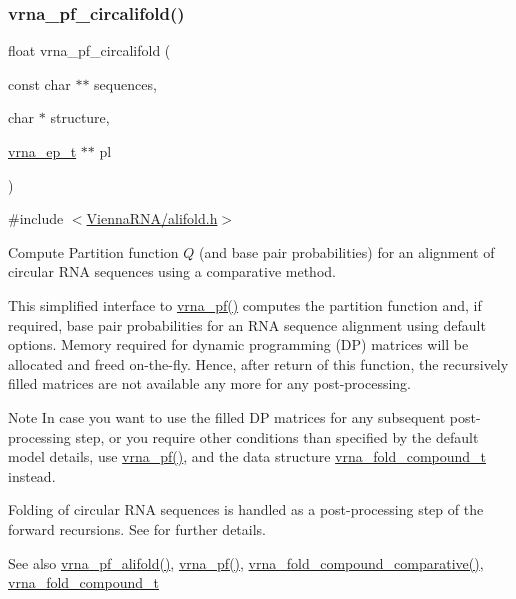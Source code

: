 \subsubsection{\texorpdfstring{vrna\+\_\+pf\+\_\+circalifold()}{vrna\_pf\_circalifold()}}
{\footnotesize\ttfamily float vrna\+\_\+pf\+\_\+circalifold (\begin{DoxyParamCaption}\item[{const char $\ast$$\ast$}]{sequences,  }\item[{char $\ast$}]{structure,  }\item[{\hyperlink{group__struct__utils_gab9ac98ab55ded9fb90043b024b915aca}{vrna\+\_\+ep\+\_\+t} $\ast$$\ast$}]{pl }\end{DoxyParamCaption})}



{\ttfamily \#include $<$\hyperlink{alifold_8h}{Vienna\+R\+N\+A/alifold.\+h}$>$}



Compute Partition function $Q$ (and base pair probabilities) for an alignment of circular R\+NA sequences using a comparative method. 

This simplified interface to \hyperlink{group__pf__fold_ga29e256d688ad221b78d37f427e0e99bc}{vrna\+\_\+pf()} computes the partition function and, if required, base pair probabilities for an R\+NA sequence alignment using default options. Memory required for dynamic programming (DP) matrices will be allocated and free\textquotesingle{}d on-\/the-\/fly. Hence, after return of this function, the recursively filled matrices are not available any more for any post-\/processing.

\begin{DoxyNote}{Note}
In case you want to use the filled DP matrices for any subsequent post-\/processing step, or you require other conditions than specified by the default model details, use \hyperlink{group__pf__fold_ga29e256d688ad221b78d37f427e0e99bc}{vrna\+\_\+pf()}, and the data structure \hyperlink{group__fold__compound_ga1b0cef17fd40466cef5968eaeeff6166}{vrna\+\_\+fold\+\_\+compound\+\_\+t} instead.
\end{DoxyNote}
Folding of circular R\+NA sequences is handled as a post-\/processing step of the forward recursions. See \cite{hofacker:2006} for further details.

\begin{DoxySeeAlso}{See also}
\hyperlink{group__consensus__pf__fold_ga374e31a0f326b2c5da5b84e143a63f38}{vrna\+\_\+pf\+\_\+alifold()}, \hyperlink{group__pf__fold_ga29e256d688ad221b78d37f427e0e99bc}{vrna\+\_\+pf()}, \hyperlink{group__fold__compound_gad6bacc816af274922b13d947f708aa0c}{vrna\+\_\+fold\+\_\+compound\+\_\+comparative()}, \hyperlink{group__fold__compound_ga1b0cef17fd40466cef5968eaeeff6166}{vrna\+\_\+fold\+\_\+compound\+\_\+t}
\end{DoxySeeAlso}

